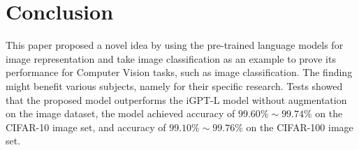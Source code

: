 \documentclass[10pt,twocolumn,letterpaper]{article}
\begin{document}
\section{Conclusion}

 This paper proposed a novel idea by using the pre-trained language models for image representation and take image classification
 as an example to prove its performance for Computer Vision tasks, such as image classification.
 The finding might benefit various subjects, namely  for their specific research.
Tests showed that the proposed model outperforms the iGPT-L model without augmentation on the image dataset,
the model achieved accuracy of $99.60\%\sim99.74\%$ on the CIFAR-10 image set,
and accuracy of $99.10\%\sim99.76\%$ on the CIFAR-100 image set.


{\small


}
\end{document}
